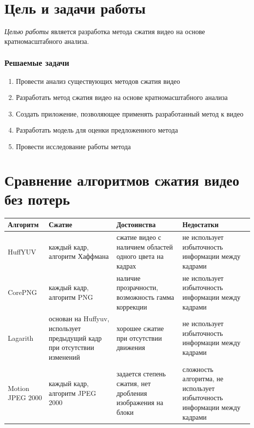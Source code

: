 \documentclass[12pt]{article}
\begin{document}

\TitleSlide


\section{Цель и задачи работы}

\emph{Целью работы} является разработка метода сжатия видео на основе кратномасштабного анализа.

\subsubsection{Решаемые задачи}

\begin{enumerate}
\item Провести анализ существующих методов сжатия видео
\item Разработать метод сжатия видео на основе кратномасштабного анализа
\item Создать приложение, позволяющее применять разработанный метод к видео
\item Разработать модель для оценки предложенного метода
\item Провести исследование работы метода
\end{enumerate}

\section{Сравнение алгоритмов сжатия видео без потерь}

\begin{table}[ht]\footnotesize 
  \begin{tabular}{|p{3.5cm}|p{7cm}|p{7cm}|p{7cm}|}
  \hline
  Алгоритм & Сжатие & Достоинства & Недостатки \\
  \hline
  HuffYUV & каждый кадр, алгоритм Хаффмана & сжатие видео с наличием областей одного цвета на кадрах & не использует избыточность информации между кадрами \\
  \hline
  CorePNG & каждый кадр, алгоритм PNG & наличие прозрачности, возможность гамма коррекции & не использует избыточность информации между кадрами \\
  \hline
  Lagarith & основан на Huffyuv, использует предыдущий кадр при отсутствии изменений & хорошее сжатие при отсутствии движения & не использует избыточность информации между кадрами \\
  \hline
  Motion JPEG 2000 & каждый кадр, алгоритм JPEG 2000 & задается степень сжатия, нет дробления изображения на блоки & сложность алгоритма, не использует избыточность информации между кадрами \\
  \hline
  \end{tabular}
  \label{tab:tabular}
\end{table}  
\end{document}
